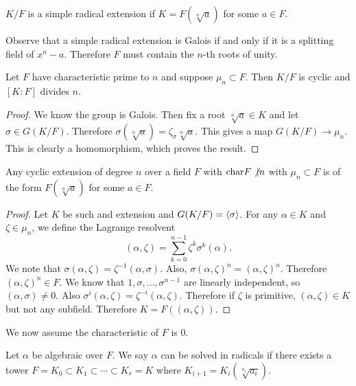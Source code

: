 \documentclass[10pt, twoside]{article}
\begin{document}
        \begin{defn}
            $K/F$ is a simple radical extension if $K = F(\sqrt[n]{a})$ for some $a \in F$.
        \end{defn}

        Observe that a simple radical extension is Galois if and only if it is a splitting field of $x^n-a$. Therefore $F$ must contain the $n$-th roots of unity.

        \begin{prop}
            Let $F$ have characteristic prime to $n$ and suppose $\mu_n \subset F$. Then $K/F$ is cyclic and $[K:F]$ divides $n$.
            \begin{proof}
                We know the group is Galois. Then fix a root $\sqrt[n]{a} \in K$ and let $\sigma \in G(K/F)$. Therefore $\sigma(\sqrt[n]{a}) = \zeta_{\sigma}\sqrt[n]{a}$. This gives a map $G(K/F) \to \mu_n$. This is clearly a homomorphism, which proves the result.
            \end{proof}
        \end{prop}

        \begin{prop}
            Any cyclic extension of degree $n$ over a field $F$ with $\mathrm{char} F \not\vert n$ with $\mu_n \subset F$ is of the form $F(\sqrt[n]{a})$ for some $a \in F$.
            \begin{proof}
                Let $K$ be such and extension and $G(K/F) = \langle\sigma\rangle$. For any $\alpha \in K$ and $\zeta \in \mu_n$, we define the Lagrange resolvent \[(\alpha, \zeta) = \sum_{k=0}^{n-1} \zeta^k \sigma^k(\alpha). \] We note that $\sigma(\alpha, \zeta) = \zeta^{-1}(\alpha, \sigma)$. Also, $\sigma (\alpha, \zeta)^n = (\alpha, \zeta)^n$. Therefore $(\alpha, \zeta)^n \in F$. We know that $1, \sigma, \ldots, \sigma^{n-1}$ are linearly independent, so $(\alpha, \sigma) \neq 0$. Also $\sigma^i(\alpha, \zeta) = \zeta^{-i}(\alpha, \zeta)$. Therefore if $\zeta$ is primitive, $(\alpha, \zeta) \in K$ but not any subfield. Therefore $K = F((\alpha, \zeta))$.
            \end{proof}
        \end{prop}

        We now assume the characteristic of $F$ is $0$.

        \begin{defn}
            Let $\alpha$ be algebraic over $F$. We say $\alpha$ can be solved in radicals if there exists a tower $F = K_0 \subset K_1 \subset \cdots \subset K_r = K$ where $K_{i+1}=K_i(\sqrt[n_i]{a_i})$.
        \end{defn}
        
\end{document}
